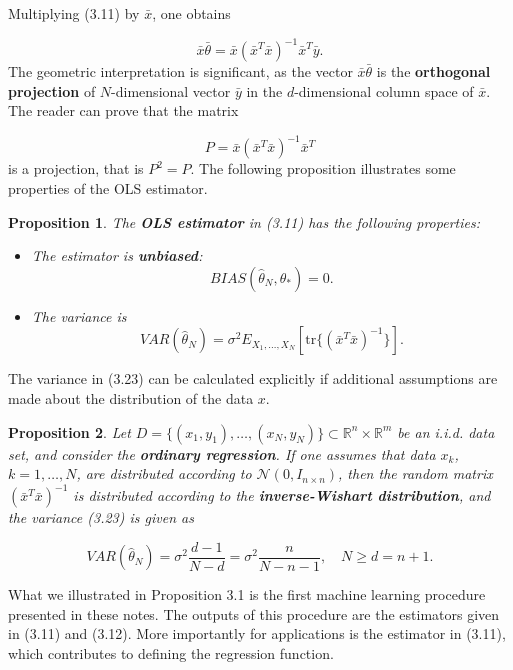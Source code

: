 \documentclass{report}
\newtheorem{proposition}{Proposition}[chapter]
\begin{document}
Multiplying (3.11) by $\bar{x}$, one obtains

\begin{equation}
\bar{x}\bar{\theta} = \bar{x}(\bar{x}^T\bar{x})^{-1}\bar{x}^T\bar{y}.
\end{equation}
The geometric interpretation is significant, as the vector $\bar{x}\bar{\theta}$ is the \textbf{orthogonal projection} of $N$-dimensional vector $\bar{y}$ in the $d$-dimensional column space of $\bar{x}$. The reader can prove that the matrix

\begin{equation}
P = \bar{x}(\bar{x}^T\bar{x})^{-1}\bar{x}^T
\end{equation}
is a projection, that is $P^2 = P$. The following proposition illustrates some properties of the OLS estimator.

\begin{proposition}
The \textbf{OLS estimator} in (3.11) has the following properties:

\begin{itemize}
\item The estimator is \textbf{unbiased}:
\begin{equation}
BIAS(\hat{\theta}_N, \theta_*) = 0.
\end{equation}
\item The variance is
\begin{equation}
VAR(\hat{\theta}_N) = \sigma^2 E_{X_1,\dots,X_N}[\mathrm{tr}\{(\bar{x}^T\bar{x})^{-1}\}].
\end{equation}
\end{itemize}
\end{proposition}
The variance in (3.23) can be calculated explicitly if additional assumptions are made about the distribution of the data $x$.

\begin{proposition}
Let $D = \{(x_1,y_1),\dots,(x_N,y_N)\} \subset \mathbb{R}^n \times \mathbb{R}^m$ be an i.i.d. data set, and consider the \textbf{ordinary regression}. If one assumes that data $x_k$, $k = 1, \dots, N$, are distributed according to $\mathcal{N}(0, I_{n\times n})$, then the random matrix $(\bar{x}^T\bar{x})^{-1}$ is distributed according to the \textbf{inverse-Wishart distribution}, and the variance (3.23) is given as

\begin{equation}
VAR(\hat{\theta}_N) = \sigma^2\frac{d - 1}{N - d} = \sigma^2\frac{n}{N - n - 1}, \quad  N \geq d = n + 1.
\end{equation}
\end{proposition}
What we illustrated in Proposition 3.1 is the first machine learning procedure presented in these notes. The outputs of this procedure are the estimators given in (3.11) and (3.12). More importantly for applications is the estimator in (3.11), which contributes to defining the regression function.
\end{document}
